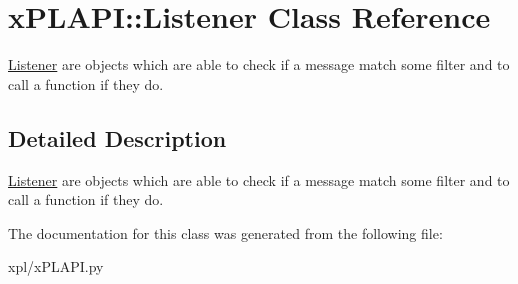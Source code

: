 \hypertarget{classxPLAPI_1_1Listener}{
\section{xPLAPI::Listener Class Reference}
\label{classxPLAPI_1_1Listener}
}
\hyperlink{classxPLAPI_1_1Listener}{Listener} are objects which are able to check if a message match some filter and to call a function if they do.  




\subsection{Detailed Description}
\hyperlink{classxPLAPI_1_1Listener}{Listener} are objects which are able to check if a message match some filter and to call a function if they do. 

The documentation for this class was generated from the following file:\begin{CompactItemize}
\item 
xpl/xPLAPI.py\end{CompactItemize}

